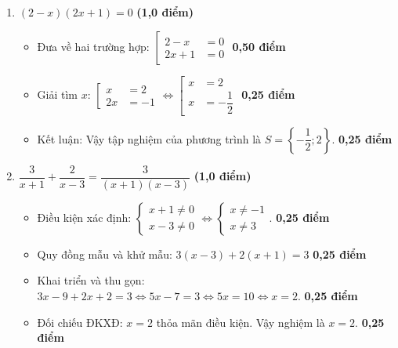 \documentclass[12pt,a4paper]{article}
\begin{document}
\begin{enumerate}[label=\alph*), leftmargin=18pt, itemsep=3pt, parsep=0pt]
  \item $(2 - x)(2x + 1) = 0$ \hfill \textbf{(1,0 điểm)}
  \begin{itemize}[leftmargin=16pt, itemsep=1.5pt, parsep=0pt]
    \item Đưa về hai trường hợp: $\left[\begin{aligned} 2 - x &= 0 \\ 2x + 1 &= 0 \end{aligned}\right.$ \dotfill \textbf{0,50 điểm}
    \item Giải tìm $x$: $\left[\begin{aligned} x &= 2 \\ 2x &= -1 \end{aligned}\right. \iff \left[\begin{aligned} x &= 2 \\ x &= -\dfrac{1}{2} \end{aligned}\right.$ \dotfill \textbf{0,25 điểm}
    \item Kết luận: Vậy tập nghiệm của phương trình là $S = \left\{-\dfrac{1}{2}; 2\right\}$. \dotfill \textbf{0,25 điểm}
  \end{itemize}

  \item $\dfrac{3}{x + 1} + \dfrac{2}{x - 3} = \dfrac{3}{(x + 1)(x - 3)}$ \hfill \textbf{(1,0 điểm)}
  \begin{itemize}[leftmargin=16pt, itemsep=1.5pt, parsep=0pt]
    \item Điều kiện xác định: $\begin{cases} x + 1 \neq 0 \\ x - 3 \neq 0 \end{cases} \iff \begin{cases} x \neq -1 \\ x \neq 3 \end{cases}$. \dotfill \textbf{0,25 điểm}
    \item Quy đồng mẫu và khử mẫu:
    $3(x - 3) + 2(x + 1) = 3$ \dotfill \textbf{0,25 điểm}
    \item Khai triển và thu gọn:
    $3x - 9 + 2x + 2 = 3 \iff 5x - 7 = 3 \iff 5x = 10 \iff x = 2$. \dotfill \textbf{0,25 điểm}
    \item Đối chiếu ĐKXĐ: $x = 2$ thỏa mãn điều kiện. Vậy nghiệm là $x = 2$. \dotfill \textbf{0,25 điểm}
  \end{itemize}
\end{enumerate}
\end{document}
